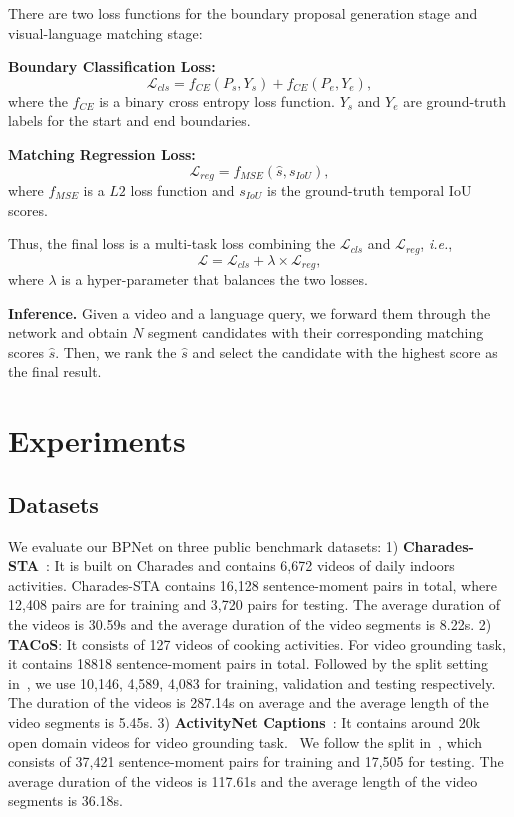 \documentclass[letterpaper]{article} %
\newcommand{\ie}{\emph{i.e.}}
\begin{document}
There are two loss functions for the boundary proposal generation stage and visual-language matching stage:

\noindent\textbf{Boundary Classification Loss:}
\begin{equation}
\mathcal{L}_{cls} = f_{CE}(P_{s},Y_{s}) + f_{CE}(P_{e},Y_{e}),
\label{equation9}
\end{equation}
where the $f_{CE}$ is a binary cross entropy loss function. 
$Y_{s}$ and $Y_{e}$ are ground-truth labels for the start and end boundaries. 

\noindent\textbf{Matching Regression Loss:}
\begin{equation}
\mathcal{L}_{reg} = f_{MSE}(\hat{s},s_{IoU}),
\label{equation10}
\end{equation}
where $f_{MSE}$ is a $L2$ loss function and $s_{IoU}$ is the ground-truth temporal IoU scores. 

Thus, the final loss is a multi-task loss combining the $\mathcal{L}_{cls}$ and $\mathcal{L}_{reg}$, \ie,
\begin{equation}
\mathcal{L} = \mathcal{L}_{cls} + \lambda \times \mathcal{L}_{reg},
\label{equation11}
\end{equation}
where $\lambda$ is a hyper-parameter that balances the two losses. 

\noindent\textbf{Inference.} Given a video and a language query, 
we forward them through the network and obtain $N$ segment candidates 
with their corresponding matching scores $\hat{s}$. Then, we rank the 
$\hat{s}$ and select the candidate with the highest score as the final 
result. 


\section{Experiments}
\subsection{Datasets}\label{Dataset}
We evaluate our BPNet on three public benchmark datasets: 1) \textbf{Charades-STA}~\cite{DBLP:conf/iccv/GaoSYN17}: It is built on Charades and contains 6,672 videos of daily indoors activities. Charades-STA contains 16,128 sentence-moment pairs in total, where 12,408 pairs are for training and 3,720 pairs for testing. The average duration of the videos is 30.59s and the average duration of the video segments is 8.22s. 2) \textbf{TACoS}: It consists of 127 videos of cooking activities.
For video grounding task, it contains 18818 sentence-moment pairs in total. 
Followed by the split setting in~\cite{DBLP:conf/iccv/GaoSYN17}, we use 10,146, 4,589, 4,083 
for training, validation and testing respectively.
The duration of the videos is 287.14s on average and the average length of the video segments 
is 5.45s. 3) \textbf{ActivityNet Captions}~\cite{DBLP:conf/iccv/KrishnaHRFN17}: It contains around 20k open domain videos for video grounding task. \
We follow the split in~\cite{DBLP:conf/aaai/YuanM019}, which consists of 37,421 
sentence-moment pairs for training and 17,505 for testing.
The average duration of the videos is 117.61s and the average length of the video segments 
is 36.18s.
\end{document}
